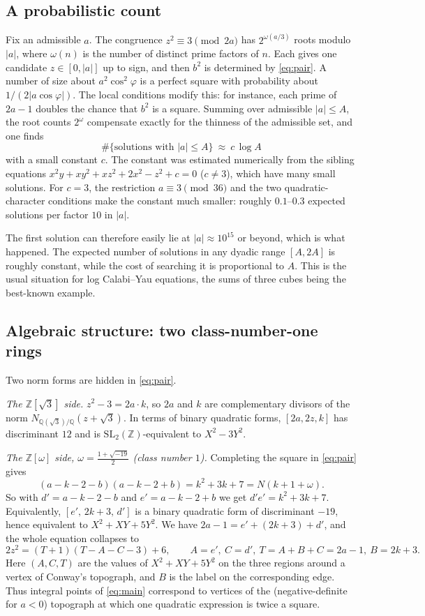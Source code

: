 \documentclass[11pt]{article}
\theoremstyle{remark}
\theoremstyle{definition}
\newcommand{\Z}{\mathbb{Z}}
\newcommand{\Q}{\mathbb{Q}}
\begin{document}
\subsection{A probabilistic count}
Fix an admissible $a$.  The congruence $z^2\equiv3\pmod{2a}$ has $2^{\omega(a/3)}$ roots modulo
$|a|$, where $\omega(n)$ is the number of distinct prime factors of $n$.  Each gives one candidate
$z\in[0,|a|]$ up to sign, and then $b^2$ is determined by \eqref{eq:pair}.  A number of size about
$a^2\cos^2\varphi$ is a perfect square with probability about $1/(2|a\cos\varphi|)$.  The local
conditions modify this: for instance, each prime of $2a-1$ doubles the chance that $b^2$ is a
square.  Summing over admissible $|a|\le A$, the root counts $2^{\omega}$ compensate exactly for
the thinness of the admissible set, and one finds
\[
\#\{\text{solutions with } |a|\le A\}\ \approx\ c\,\log A
\]
with a small constant $c$.  The constant was estimated numerically from the sibling equations
$x^2y+xy^2+xz^2+2x^2-z^2+c=0$ ($c\ne 3$), which have many small solutions.  For $c=3$, the restriction
$a\equiv3\pmod{36}$ and the two quadratic-character conditions make the constant much smaller:
roughly $0.1$--$0.3$ expected solutions per factor $10$ in $|a|$.

The first solution can therefore easily lie at $|a|\approx10^{15}$ or beyond, which is what happened.
The expected number of solutions in any dyadic range $[A,2A]$ is roughly constant, while the cost
of searching it is proportional to $A$.  This is the usual situation for log Calabi--Yau equations,
the sums of three cubes being the best-known example.

\subsection{Algebraic structure: two class-number-one rings}
Two norm forms are hidden in \eqref{eq:pair}.

\emph{The $\Z[\sqrt3]$ side.}  $z^2-3=2a\cdot k$, so $2a$ and $k$ are complementary divisors of the
norm $N_{\Q(\sqrt3)/\Q}(z+\sqrt3)$.  In terms of binary quadratic forms, $[2a,2z,k]$ has
discriminant $12$ and is $\mathrm{SL}_2(\Z)$-equivalent to $X^2-3Y^2$.

\emph{The $\Z[\omega]$ side, $\omega=\frac{1+\sqrt{-19}}2$ (class number $1$).}  Completing the square
in \eqref{eq:pair} gives
\begin{equation}\label{eq:dprime}
(a-k-2-b)(a-k-2+b)=k^2+3k+7=N(k+1+\omega).
\end{equation}
So with $d'=a-k-2-b$ and $e'=a-k-2+b$ we get $d'e'=k^2+3k+7$.  Equivalently, $[e',\,2k+3,\,d']$ is
a binary quadratic form of discriminant $-19$, hence equivalent to $X^2+XY+5Y^2$.  We have
$2a-1=e'+(2k+3)+d'$, and the whole equation collapses to
\begin{equation}\label{eq:topo}
2z^2=(T+1)(T-A-C-3)+6,\qquad A=e',\ C=d',\ T=A+B+C=2a-1,\ B=2k+3 .
\end{equation}
Here $(A,C,T)$ are the values of $X^2+XY+5Y^2$ on the three regions around a vertex of Conway's
topograph, and $B$ is the label on the corresponding edge.  Thus integral points of
\eqref{eq:main} correspond to vertices of the (negative-definite for $a<0$) topograph at which
one quadratic expression is twice a square.
\end{document}

